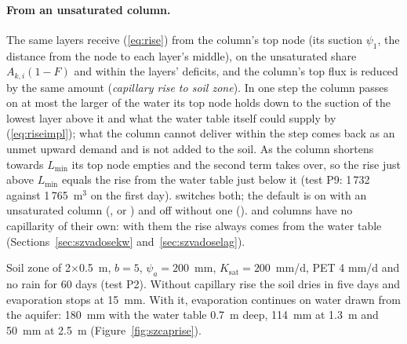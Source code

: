 \paragraph{From an unsaturated column.} The same layers receive (\ref{eq:rise}) from the column's top node (its suction
$\psi_1$, the distance from the node to each layer's middle), on the unsaturated share $A_{k,i}(1-F)$ and within the layers'
deficits, and the column's top flux is reduced by the same amount (\emph{capillary rise to soil zone}). In one step the
column passes on at most the larger of the water its top node holds down to the suction of the lowest layer above it
and what the water table itself could supply by (\ref{eq:riseimpl}); what the column cannot deliver within the step
comes back as an unmet upward demand and is not added to the soil. As the column shortens towards $L_{\min}$ its top
node empties and the second term takes over, so the rise just above $L_{\min}$ equals the rise from the water table
just below it (test P9: 1\,732 against 1\,765~m$^3$ on the first day).  switches both; the default is on with an unsaturated column
(,  or ) and off without one ().  and 
columns have no capillarity of their own: with them the rise always comes from the water table (Sections~\ref{sec:szvadosekw}
and~\ref{sec:szvadoselag}).

\begin{example}
Soil zone of 2$\times$0.5~m, $b=5$, $\psi_a=200$~mm, $K_{\mathrm{sat}}=200$~mm/d, PET 4 mm/d and no rain for 60 days
(test P2). Without capillary rise the soil dries in five days and evaporation stops at 15~mm. With it, evaporation
continues on water drawn from the aquifer: 180~mm with the water table 0.7~m deep, 114~mm at 1.3~m and 50~mm at 2.5~m
(Figure~\ref{fig:szcaprise}).
\end{example}



